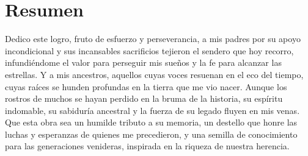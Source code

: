\section*{\centering Resumen}

Dedico este logro, fruto de esfuerzo y perseverancia, a mis padres por su apoyo incondicional y sus incansables sacrificios tejieron el sendero que hoy recorro,
infundiéndome el valor para perseguir mis sueños y la fe para alcanzar las estrellas.
Y a mis ancestros, aquellos cuyas voces resuenan en el eco del tiempo, cuyas raíces se hunden profundas en la tierra que me vio nacer. 
Aunque los rostros de muchos se hayan perdido en la bruma de la historia, su espíritu indomable, su sabiduría ancestral y la fuerza de su legado fluyen en mis venas. Que esta obra sea un humilde tributo a su memoria, un destello que honre las luchas y esperanzas de quienes me precedieron, y una semilla de conocimiento para las generaciones venideras, inspirada en la riqueza de nuestra herencia.
